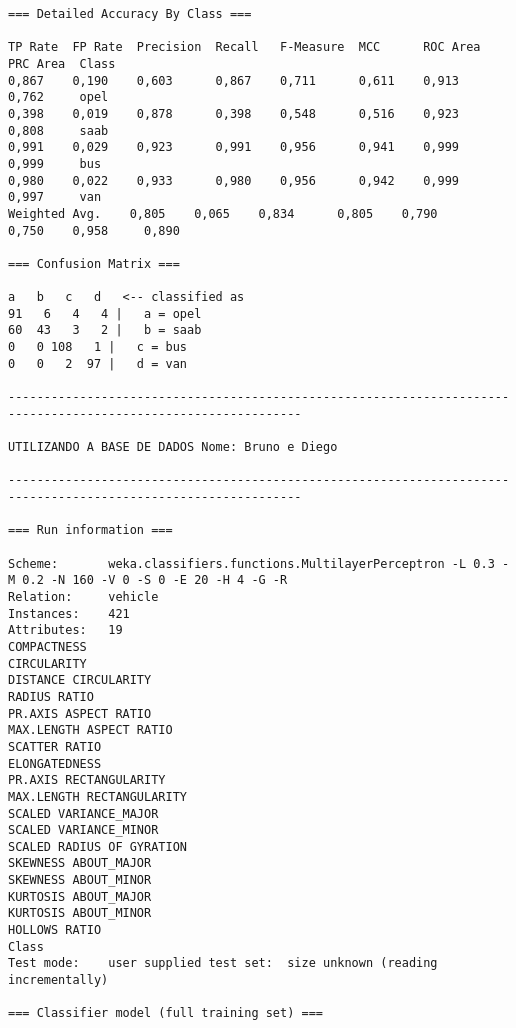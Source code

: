 \documentclass[
	article,			%
	11pt,				%
	oneside,			%
	a4paper,			%
	english,			%
	brazil,				%
	sumario=tradicional
	]{abntex2}
\begin{document}
\begin{lstlisting}
=== Detailed Accuracy By Class ===

TP Rate  FP Rate  Precision  Recall   F-Measure  MCC      ROC Area  PRC Area  Class
0,867    0,190    0,603      0,867    0,711      0,611    0,913     0,762     opel
0,398    0,019    0,878      0,398    0,548      0,516    0,923     0,808     saab
0,991    0,029    0,923      0,991    0,956      0,941    0,999     0,999     bus
0,980    0,022    0,933      0,980    0,956      0,942    0,999     0,997     van
Weighted Avg.    0,805    0,065    0,834      0,805    0,790      0,750    0,958     0,890     

=== Confusion Matrix ===

a   b   c   d   <-- classified as
91   6   4   4 |   a = opel
60  43   3   2 |   b = saab
0   0 108   1 |   c = bus
0   0   2  97 |   d = van

---------------------------------------------------------------------------------------------------------------

UTILIZANDO A BASE DE DADOS Nome: Bruno e Diego

---------------------------------------------------------------------------------------------------------------

=== Run information ===

Scheme:       weka.classifiers.functions.MultilayerPerceptron -L 0.3 -M 0.2 -N 160 -V 0 -S 0 -E 20 -H 4 -G -R
Relation:     vehicle
Instances:    421
Attributes:   19
COMPACTNESS
CIRCULARITY
DISTANCE CIRCULARITY
RADIUS RATIO
PR.AXIS ASPECT RATIO
MAX.LENGTH ASPECT RATIO
SCATTER RATIO
ELONGATEDNESS
PR.AXIS RECTANGULARITY
MAX.LENGTH RECTANGULARITY
SCALED VARIANCE_MAJOR
SCALED VARIANCE_MINOR
SCALED RADIUS OF GYRATION
SKEWNESS ABOUT_MAJOR
SKEWNESS ABOUT_MINOR
KURTOSIS ABOUT_MAJOR
KURTOSIS ABOUT_MINOR
HOLLOWS RATIO
Class
Test mode:    user supplied test set:  size unknown (reading incrementally)

=== Classifier model (full training set) ===


\end{lstlisting}
\end{document}
